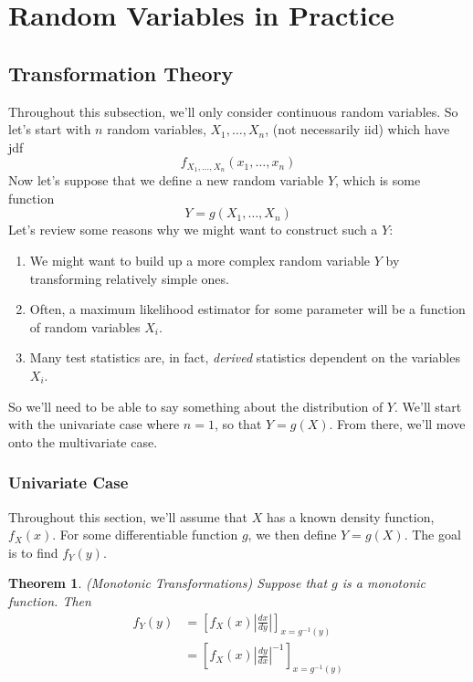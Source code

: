 \documentclass[12pt]{article}
\theoremstyle{plain}
\newtheorem{thm}{Theorem}[section]
\theoremstyle{definition}
\theoremstyle{remark}
\begin{document}
\clearpage
\section{Random Variables in Practice}
\subsection{Transformation Theory}

Throughout this subsection, we'll only consider continuous random
variables. So let's start with $n$ random variables, $X_1, \ldots, X_n$,
(not necessarily iid) which have jdf
   \[ f_{X_1, \ldots, X_n}(x_1, \ldots, x_n) \]
Now let's suppose that we define a new random variable $Y$, which is
some function
   \[ Y = g(X_1, \ldots, X_n) \]
Let's review some reasons why we might want to construct such a $Y$:
\begin{enumerate}
  \item We might want to build up a more complex random variable $Y$
    by transforming relatively simple ones.
  \item Often, a maximum likelihood estimator for some parameter will be
    a function of random variables $X_i$.
  \item Many test statistics are, in fact, \emph{derived} statistics
    dependent on the variables $X_i$.
\end{enumerate}
So we'll need to be able to say something about the distribution of $Y$.
We'll start with the univariate case where $n=1$, so that $Y=g(X)$. From
there, we'll move onto the multivariate case.

\subsubsection{Univariate Case}

Throughout this section, we'll assume that $X$ has a known density
function, $f_X(x)$. For some differentiable function $g$, we then define
$Y = g(X)$. The goal is to find $f_Y(y)$.

\begin{thm}\emph{(Monotonic Transformations)}
Suppose that $g$ is a monotonic function. Then
\begin{align*}
   f_Y(y) &= \left[f_X(x) \left\lvert \frac{dx}{dy}\right\rvert
      \right]_{x = g^{-1}(y)} \\
    &= \left[ f_X(x) \left\lvert \frac{dy}{dx}\right\rvert^{-1}
      \right]_{x = g^{-1}(y)}
\end{align*}
\end{thm}
\end{document}
